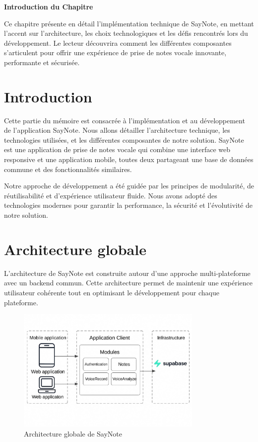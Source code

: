 
\begin{center}
\textbf{\large Introduction du Chapitre}
\end{center}

\noindent
Ce chapitre présente en détail l'implémentation technique de SayNote, en mettant l'accent sur l'architecture, les choix technologiques et les défis rencontrés lors du développement. Le lecteur découvrira comment les différentes composantes s'articulent pour offrir une expérience de prise de notes vocale innovante, performante et sécurisée.

\section{Introduction}
Cette partie du mémoire est consacrée à l'implémentation et au développement de l'application SayNote. Nous allons détailler l'architecture technique, les technologies utilisées, et les différentes composantes de notre solution. SayNote est une application de prise de notes vocale qui combine une interface web responsive et une application mobile, toutes deux partageant une base de données commune et des fonctionnalités similaires.

Notre approche de développement a été guidée par les principes de modularité, de réutilisabilité et d'expérience utilisateur fluide. Nous avons adopté des technologies modernes pour garantir la performance, la sécurité et l'évolutivité de notre solution.

\section{Architecture globale}
L'architecture de SayNote est construite autour d'une approche multi-plateforme avec un backend commun. Cette architecture permet de maintenir une expérience utilisateur cohérente tout en optimisant le développement pour chaque plateforme.

\begin{figure}[H]
    \centering
    \includegraphics[width=0.8\textwidth]{assets/docs/golobal-diagrams/global-architecture.jpg}
    \caption{Architecture globale de SayNote}
    \label{fig:global-architecture}
\end{figure}


